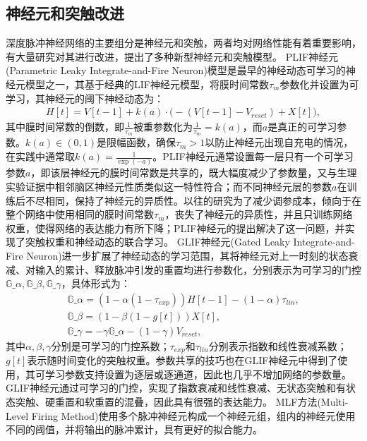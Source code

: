 \documentclass{SCIS2020cn}
\begin{document}
\subsection{神经元和突触改进}%
深度脉冲神经网络的主要组分是神经元和突触，两者均对网络性能有着重要影响，有大量研究对其进行改进，提出了多种新型神经元和突触模型。
PLIF神经元(Parametric Leaky Integrate-and-Fire Neuron)模型是最早的神经动态可学习的神经元模型之一，其基于经典的LIF神经元模型，将膜时间常数$\tau_{m}$参数化并设置为可学习，其神经元的阈下神经动态为：
\begin{eqnarray}
	H[t] = V[t-1] + k(a)\cdot\Big(-(V[t-1] - V_{reset}) + X[t]\Big), \label{eq, plif charge}
\end{eqnarray}
其中膜时间常数的倒数，即$\frac{1}{\tau_{m}}$被重参数化为$\frac{1}{\tau_{m}}=k(a)$，而$a$是真正的可学习参数。$k(a)\in (0, 1)$是限幅函数，确保$\tau_{m} > 1$以防止神经元出现自充电的情况，在实践中通常取$k(a) = \frac{1}{\exp(-a)}$。PLIF神经元通常设置每一层只有一个可学习参数$a$，即该层神经元的膜时间常数是共享的，既大幅度减少了参数量，又与生理实验证据中相邻脑区神经元性质类似这一特性符合；而不同神经元层的参数$a$在训练后不尽相同，保持了神经元的异质性。以往的研究为了减少调参成本，倾向于在整个网络中使用相同的膜时间常数$\tau_{m}$，丧失了神经元的异质性，并且只训练网络权重，使得网络的表达能力有所下降；PLIF神经元的提出解决了这一问题，并实现了突触权重和神经动态的联合学习。
GLIF神经元(Gated Leaky Integrate-and-Fire
Neuron)进一步扩展了神经动态的学习范围，其将神经元对上一时刻的状态衰减、对输入的累计、释放脉冲引发的重置均进行参数化，分别表示为可学习的门控$\mathbb{G}\_{\alpha}, \mathbb{G}\_{\beta}, \mathbb{G}\_{\gamma}$，具体形式为：
\begin{eqnarray}
	\mathbb{G}\_{\alpha} = (1 - \alpha (1 - \tau_{exp}))H[t-1] - (1 - \alpha)\tau_{lin}, \\
	\mathbb{G}\_{\beta} = (1 - \beta (1 - g[t]))X[t], \\
	\mathbb{G}\_{\gamma} = -\gamma \mathbb{G}\_{\alpha} - (1 - \gamma) V_{reset},
\end{eqnarray}
其中$\alpha, \beta, \gamma$分别是可学习的门控系数；$\tau_{exp}$和$\tau_{lin}$分别表示指数和线性衰减系数；$g[t]$表示随时间变化的突触权重。参数共享的技巧也在GLIF神经元中得到了使用，其可学习参数支持设置为逐层或逐通道，因此也几乎不增加网络的参数量。GLIF神经元通过可学习的门控，实现了指数衰减和线性衰减、无状态突触和有状态突触、硬重置和软重置的混叠，因此具有很强的表达能力。
MLF方法(Multi-Level Firing Method)使用多个脉冲神经元构成一个神经元组，组内的神经元使用不同的阈值，并将输出的脉冲累计，具有更好的拟合能力。
\end{document}
